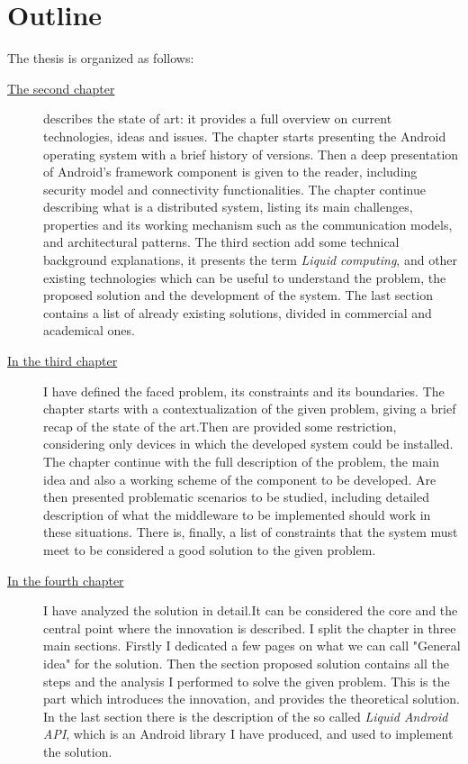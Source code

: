 \section{Outline}
%
\par The thesis is organized as follows:
%
%
\begin{description}
%
\item[{\hyperref[cap:statoarte]{The second chapter}}] describes the state of art: it provides a full overview on current technologies, ideas and issues. The chapter starts presenting the Android operating system with a brief history of versions. Then a deep presentation of Android's framework component is given to the reader, including security model and connectivity functionalities. The chapter continue describing what is a distributed system, listing its main challenges, properties and its working mechanism such as the communication models, and architectural patterns. The third section add some technical background explanations, it presents the term \textit{Liquid computing}, and other existing technologies which can be useful to understand the problem, the proposed solution and the development of the system. The last section contains a list of already existing solutions, divided in commercial and academical ones.
%
\item[{\hyperref[cap:probanalysis]{In the third chapter}}] I have defined the faced problem, its constraints and its boundaries. The chapter starts with a contextualization of the given problem, giving a brief recap of the state of the art.Then are provided some restriction, considering only devices in which the developed system could be installed. The chapter continue with the full description of the problem, the main idea and also a working scheme of the component to be developed. Are then presented problematic scenarios to be studied, including detailed description of what the middleware to be implemented should work in these situations. There is, finally, a list of constraints that the system must meet to be considered a good solution to the given problem.

\item[{\hyperref[cap:proposedsolution]{In the fourth chapter}}] I have analyzed the solution in detail.It can be considered
the core and the central point where the innovation is described. I split the chapter in three main sections. Firstly I dedicated a few pages on what we can call "General idea" for the solution. Then the section proposed solution contains all the steps and the analysis I performed to solve the given problem. This is the part which introduces the innovation, and provides the theoretical solution. In the last section there is the description of the so called \textit{Liquid Android API}, which is an Android library I have produced, and used to implement the solution.


\end{description}
